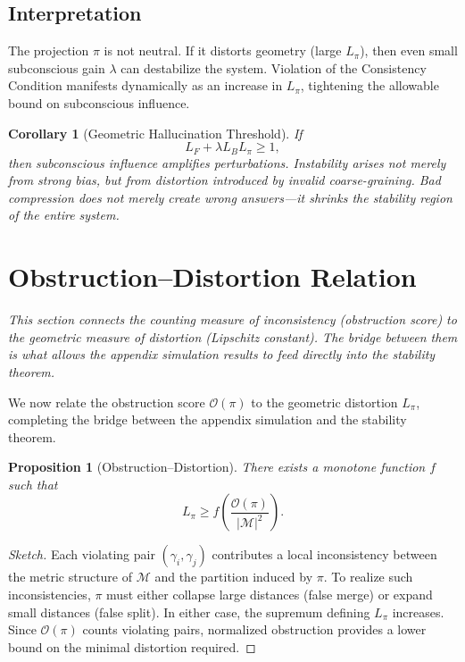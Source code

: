 \documentclass[12pt,a4paper]{article}
\newtheorem{proposition}[theorem]{Proposition}
\newtheorem{corollary}[theorem]{Corollary}
\begin{document}
\subsection{Interpretation}

The projection $\pi$ is not neutral. If it distorts geometry (large $L_\pi$), then even small subconscious gain $\lambda$ can destabilize the system. Violation of the Consistency Condition manifests dynamically as an increase in $L_\pi$, tightening the allowable bound on subconscious influence.

\begin{corollary}[Geometric Hallucination Threshold]
If
\[
L_F + \lambda L_B L_\pi \geq 1,
\]
then subconscious influence amplifies perturbations. Instability arises not merely from strong bias, but from distortion introduced by invalid coarse-graining. Bad compression does not merely create wrong answers---it shrinks the stability region of the entire system.
\end{corollary}

\section{Obstruction--Distortion Relation}
\label{sec:prop}

\textit{This section connects the counting measure of inconsistency (obstruction score) to the geometric measure of distortion (Lipschitz constant). The bridge between them is what allows the appendix simulation results to feed directly into the stability theorem.}

We now relate the obstruction score $\mathcal{O}(\pi)$ to the geometric distortion $L_\pi$, completing the bridge between the appendix simulation and the stability theorem.

\begin{proposition}[Obstruction--Distortion]
\label{prop:od}
There exists a monotone function $f$ such that
\[
L_\pi \geq f\!\left(\frac{\mathcal{O}(\pi)}{|\mathcal{M}|^2}\right).
\]
\end{proposition}

\begin{proof}[Sketch]
Each violating pair $(\gamma_i, \gamma_j)$ contributes a local inconsistency between the metric structure of $\mathcal{M}$ and the partition induced by $\pi$. To realize such inconsistencies, $\pi$ must either collapse large distances (false merge) or expand small distances (false split). In either case, the supremum defining $L_\pi$ increases. Since $\mathcal{O}(\pi)$ counts violating pairs, normalized obstruction provides a lower bound on the minimal distortion required.
\end{proof}
\end{document}
